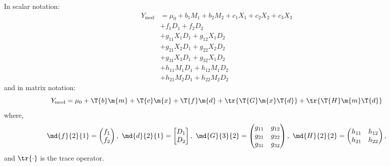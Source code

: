 In scalar notation:
\begin{equation*}
    \begin{aligned}
        Y_\text{mod} &= \mu_0 + b_1M_1 + b_2M_2 + c_1X_1 + c_2X_2 + c_3X_3\\
        &+ f_1D_1 + f_2D_2\\
        &+ g_{11}X_1D_1 + g_{12}X_1D_2\\
        &+ g_{21}X_2D_1 + g_{22}X_2D_2\\
        &+ g_{31}X_3D_1 + g_{32}X_1D_2\\
        &+ h_{11}M_1D_1 + h_{12}M_1D_2\\
        &+ h_{21}M_2D_1 + h_{22}M_2D_2
    \end{aligned}
\end{equation*}
and in matrix notation:
\begin{equation}\label{eq:mod}
    Y_\text{mod} = \mu_0 + \T{b}\m{m} + \T{c}\m{x} + \T{f}\m{d} + \tr{\T{G}\m{x}\T{d}} + \tr{\T{H}\m{m}\T{d}}
\end{equation}
where,
\begin{equation*}
    \md{f}{2}{1} =
        \begin{pmatrix}
            f_1\\
            f_2
        \end{pmatrix},\ 
    \md{d}{2}{1} =
        \begin{bmatrix}
            D_1\\
            D_2
        \end{bmatrix},\ 
    \md{G}{3}{2} =
        \begin{pmatrix}
            g_{11}  &g_{12}\\
            g_{21}  &g_{22}\\
            g_{31}  &g_{32}
        \end{pmatrix},\ 
    \md{H}{2}{2} =
    \begin{pmatrix}
        h_{11}  &h_{12}\\
        h_{21}  &h_{22}
    \end{pmatrix},
\end{equation*}
and $\tr{\cdot}$ is the trace operator.

